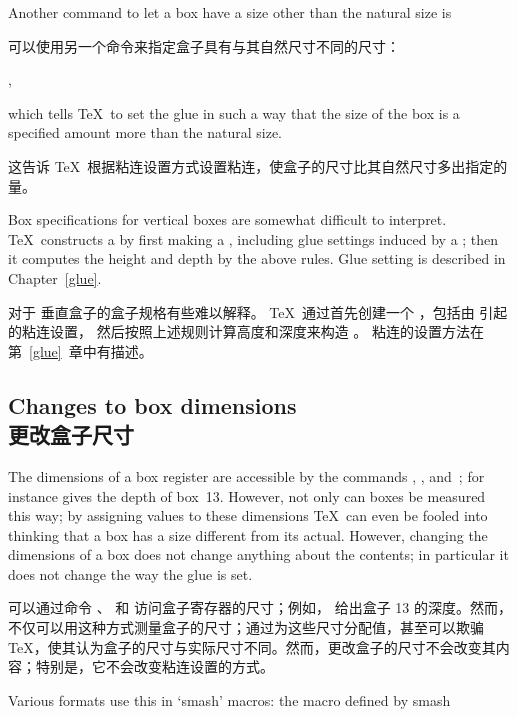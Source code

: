 Another command to let a box have a size other than
the natural size is

可以使用另一个命令来指定盒子具有与其自然尺寸不同的尺寸：
\begin{disp}   ,
        \end{disp}
which tells \TeX\ to set the glue in such a way that
the size of the box is a  specified amount more than the 
natural size.

这告诉 \TeX\ 根据粘连设置方式设置粘连，使盒子的尺寸比其自然尺寸多出指定的量。

Box specifications for  vertical boxes are
somewhat difficult to interpret. \TeX\ constructs a 
by first making a , including 
glue settings induced by a ;
then it computes the height and depth by the above rules.
Glue setting is described in Chapter~\ref{glue}.

对于  垂直盒子的盒子规格有些难以解释。
\TeX\ 通过首先创建一个 ，包括由  引起的粘连设置，
然后按照上述规则计算高度和深度来构造 。
粘连的设置方法在第~\ref{glue}~章中有描述。


\subsection{Changes to box dimensions\\更改盒子尺寸}

The dimensions of a box register are accessible by the
commands , , and~;
for instance  gives the depth of box~13.
However, not only can boxes be measured this way;
by assigning values to these
dimensions \TeX\ can even be fooled into thinking that
a box has a  size different from its actual.
However, changing the dimensions of a box does not change
anything about the contents; in particular it does not
change the way the glue is set.

可以通过命令 、 和  访问盒子寄存器的尺寸；例如， 给出盒子 13 的深度。然而，不仅可以用这种方式测量盒子的尺寸；通过为这些尺寸分配值，甚至可以欺骗 \TeX，使其认为盒子的尺寸与实际尺寸不同。然而，更改盒子的尺寸不会改变其内容；特别是，它不会改变粘连设置的方式。

Various formats use this in `smash' macros: the macro defined by
\cstoidx smash\par

